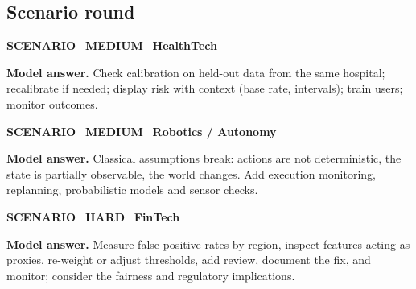 \documentclass[11pt]{article}
\begin{document}
\subsection*{\color{leaf}Scenario round}
\begin{tcolorbox}[enhanced,breakable,colback=white,colframe=leaf,arc=2mm,boxrule=0.8pt,left=3mm,right=3mm,
 title={\textbf{QIV.13}\quad Doctors over-trust a model's 0.9 'probability'. What do you check and change?},fonttitle=\color{white}\small,colbacktitle=leaf]
\colorbox{leaf!15}{\scriptsize\bfseries\color{leaf} SCENARIO}\
\colorbox{gold!85!black!15}{\scriptsize\bfseries\color{gold!85!black} MEDIUM}\
\colorbox{navy!8}{\scriptsize\bfseries\color{navy} HealthTech}\par\smallskip
\textbf{\color{navy}Model answer.} Check calibration on held-out data from the same hospital; recalibrate if needed; display risk with context (base rate, intervals); train users; monitor outcomes.
\end{tcolorbox}
\begin{tcolorbox}[enhanced,breakable,colback=white,colframe=leaf,arc=2mm,boxrule=0.8pt,left=3mm,right=3mm,
 title={\textbf{QIV.14}\quad Your plan works in simulation but fails in the real warehouse. Why?},fonttitle=\color{white}\small,colbacktitle=leaf]
\colorbox{leaf!15}{\scriptsize\bfseries\color{leaf} SCENARIO}\
\colorbox{gold!85!black!15}{\scriptsize\bfseries\color{gold!85!black} MEDIUM}\
\colorbox{navy!8}{\scriptsize\bfseries\color{navy} Robotics / Autonomy}\par\smallskip
\textbf{\color{navy}Model answer.} Classical assumptions break: actions are not deterministic, the state is partially observable, the world changes. Add execution monitoring, replanning, probabilistic models and sensor checks.
\end{tcolorbox}
\begin{tcolorbox}[enhanced,breakable,colback=white,colframe=leaf,arc=2mm,boxrule=0.8pt,left=3mm,right=3mm,
 title={\textbf{QIV.15}\quad A fraud model flags many legitimate transactions from one region. How do you respond?},fonttitle=\color{white}\small,colbacktitle=leaf]
\colorbox{leaf!15}{\scriptsize\bfseries\color{leaf} SCENARIO}\
\colorbox{crimson!15}{\scriptsize\bfseries\color{crimson} HARD}\
\colorbox{navy!8}{\scriptsize\bfseries\color{navy} FinTech}\par\smallskip
\textbf{\color{navy}Model answer.} Measure false-positive rates by region, inspect features acting as proxies, re-weight or adjust thresholds, add review, document the fix, and monitor; consider the fairness and regulatory implications.
\end{tcolorbox}
\end{document}
